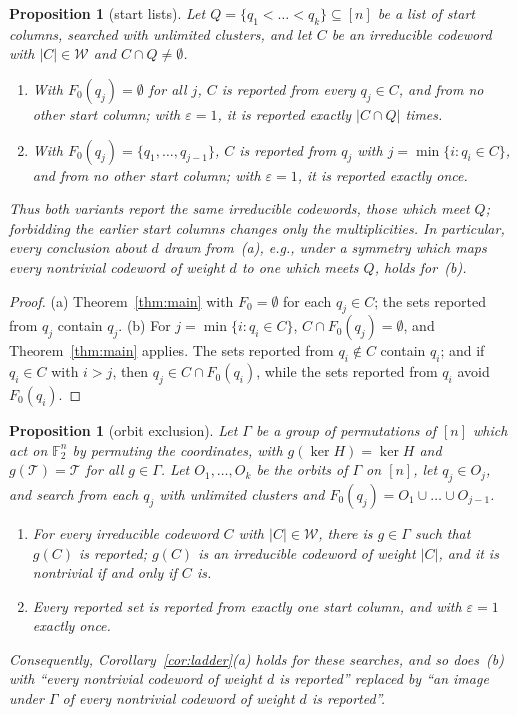 \documentclass[11pt]{article}
\newtheorem{proposition}[theorem]{Proposition}
\theoremstyle{definition}
\newcommand{\Ftwo}{\mathbb{F}_2}
\newcommand{\Tr}{\mathcal{T}}   %
\newcommand{\Wr}{\mathcal{W}}   %
\begin{document}
\begin{proposition}[start lists]\label{prop:start}
Let $Q=\{q_1<\dots<q_k\}\subseteq[n]$ be a list of start columns, searched with unlimited clusters, and let $C$ be an
irreducible codeword with $|C|\in\Wr$ and $C\cap Q\neq\emptyset$.
\begin{enumerate}[label=(\alph*)]
  \item With $F_0(q_j)=\emptyset$ for all $j$, $C$ is reported from every $q_j\in C$, and from no other start column;
    with $\varepsilon=1$, it is reported exactly $|C\cap Q|$ times.
  \item With $F_0(q_j)=\{q_1,\dots,q_{j-1}\}$, $C$ is reported from $q_j$ with $j=\min\{i:q_i\in C\}$, and from no
    other start column; with $\varepsilon=1$, it is reported exactly once.
\end{enumerate}
Thus both variants report the same irreducible codewords, those which meet $Q$; forbidding the earlier start columns
changes only the multiplicities. In particular, every conclusion about $d$ drawn from~(a), e.g., under a symmetry
which maps every nontrivial codeword of weight $d$ to one which meets $Q$, holds for~(b).
\end{proposition}

\begin{proof}
(a) Theorem~\ref{thm:main} with $F_0=\emptyset$ for each $q_j\in C$; the sets reported from $q_j$ contain $q_j$.
(b) For $j=\min\{i:q_i\in C\}$, $C\cap F_0(q_j)=\emptyset$, and Theorem~\ref{thm:main} applies. The sets reported from
$q_i\notin C$ contain $q_i$; and if $q_i\in C$ with $i>j$, then $q_j\in C\cap F_0(q_i)$, while the sets reported from
$q_i$ avoid $F_0(q_i)$.
\end{proof}

\begin{proposition}[orbit exclusion]\label{prop:orbits}
Let $\Gamma$ be a group of permutations of $[n]$ which act on $\Ftwo^n$ by permuting the coordinates, with
$g(\ker H)=\ker H$ and $g(\Tr)=\Tr$ for all $g\in\Gamma$. Let $O_1,\dots,O_k$ be the orbits of $\Gamma$ on $[n]$, let
$q_j\in O_j$, and search from each $q_j$ with unlimited clusters and $F_0(q_j)=O_1\cup\dots\cup O_{j-1}$.
\begin{enumerate}[label=(\alph*)]
  \item For every irreducible codeword $C$ with $|C|\in\Wr$, there is $g\in\Gamma$ such that $g(C)$ is reported;
    $g(C)$ is an irreducible codeword of weight $|C|$, and it is nontrivial if and only if $C$ is.
  \item Every reported set is reported from exactly one start column, and with $\varepsilon=1$ exactly once.
\end{enumerate}
Consequently, Corollary~\ref{cor:ladder}(a) holds for these searches, and so does~(b) with ``every nontrivial codeword
of weight $d$ is reported'' replaced by ``an image under $\Gamma$ of every nontrivial codeword of weight $d$ is
reported''.
\end{proposition}
\end{document}
